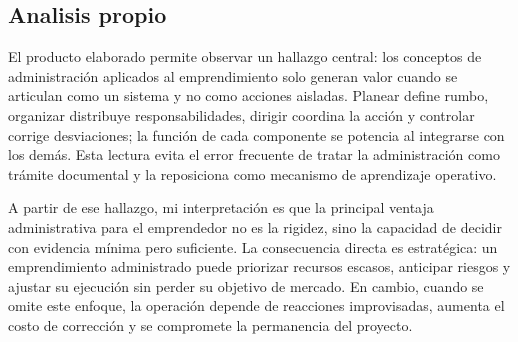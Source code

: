 \documentclass[
	spanish,
	letterpaper, oneside
]{article}
\begin{document}
%

\subsection{Analisis propio}

El producto elaborado permite observar un hallazgo central: los conceptos de administración aplicados al emprendimiento solo generan valor cuando se articulan como un sistema y no como acciones aisladas. Planear define rumbo, organizar distribuye responsabilidades, dirigir coordina la acción y controlar corrige desviaciones; la función de cada componente se potencia al integrarse con los demás. Esta lectura evita el error frecuente de tratar la administración como trámite documental y la reposiciona como mecanismo de aprendizaje operativo.

A partir de ese hallazgo, mi interpretación es que la principal ventaja administrativa para el emprendedor no es la rigidez, sino la capacidad de decidir con evidencia mínima pero suficiente. La consecuencia directa es estratégica: un emprendimiento administrado puede priorizar recursos escasos, anticipar riesgos y ajustar su ejecución sin perder su objetivo de mercado. En cambio, cuando se omite este enfoque, la operación depende de reacciones improvisadas, aumenta el costo de corrección y se compromete la permanencia del proyecto.
\end{document}
